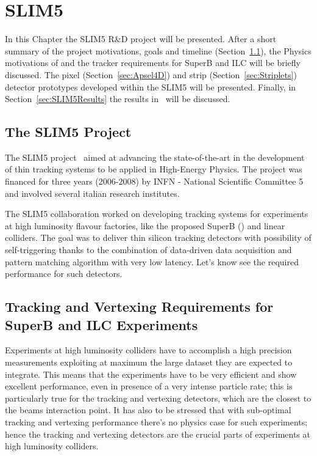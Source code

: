 \chapter{SLIM5}
\label{chap:SLIM5}
In this Chapter the SLIM5 R\&D project will be presented. After a short summary of the project 
motivations, goals and timeline (Section~\ref{sec:SLIM5Project}), the Physics motivations of 
and the tracker requirements for SuperB and ILC will be briefly discussed. 
The pixel  (Section~\ref{sec:Apsel4D}) and strip (Section~\ref{sec:Striplets}) 
detector prototypes developed 
within the SLIM5 will be presented. Finally, in Section~\ref{sec:SLIM5Results} the results 
in~\cite{BETTARINI2010942,BOMBEN2010159} will be discussed.


\section{The SLIM5 Project}
\label{sec:SLIM5Project}
The SLIM5 project~\cite{SLIM5:proj} aimed at advancing the state-of-the-art in the development of thin 
tracking systems to be applied in High-Energy Physics. The project was financed for three years
 (2006-2008) by INFN - National Scientific Committee 5~\cite{INFN_V} and involved several 
 italian research institutes. 
 
 The SLIM5 collaboration worked on developing tracking systems for experiments at 
 high luminosity flavour 
 factories, like the proposed SuperB (\cite{Baszczyk:2013xua}) and linear colliders. The goal was to deliver thin silicon tracking detectors with possibility 
 of self-triggering thanks to the combination of data-driven data acquisition and pattern matching 
 algorithm with very low latency.
Let's know see the required performance for such detectors. 

\section{Tracking and Vertexing Requirements for SuperB and ILC Experiments}
Experiments at high luminosity colliders have to accomplish a high precision measurements 
exploiting at maximum the large dataset they are expected to integrate. 
This means that the experiments have to be very efficient and show excellent performance, 
even in presence of a very intense particle rate; this is particularly true for the tracking and 
vertexing detectors, which are the closest to the beams interaction point. It has also to be stressed 
that with sub-optimal tracking and vertexing performance there's no physics case for such 
experiments; hence the tracking and vertexing detectors are the crucial parts of experiments at 
high luminosity colliders.

